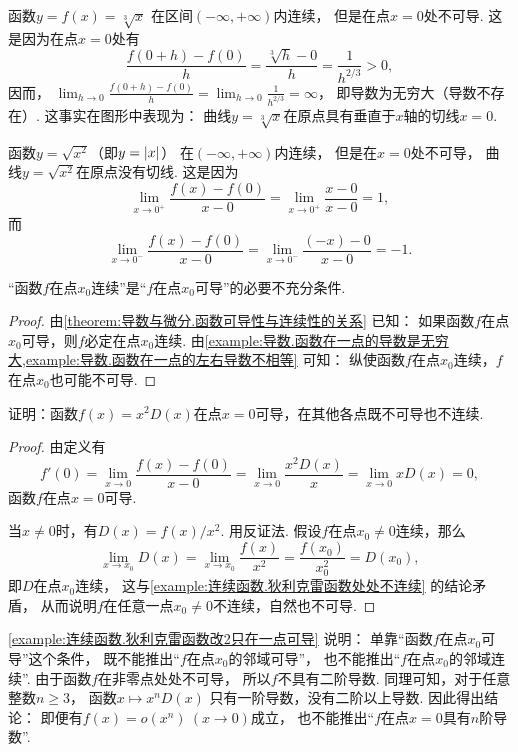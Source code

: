 \begin{example}\label{example:导数.函数在一点的导数是无穷大}
函数\(y=f(x)=\sqrt[3]x\)
在区间\((-\infty,+\infty)\)内连续，
但是在点\(x=0\)处不可导.
这是因为在点\(x=0\)处有\[
	\frac{f(0+h)-f(0)}{h}
	=\frac{\sqrt[3]{h}-0}{h}
	=\frac{1}{h^{2/3}}>0,
\]
因而，
\(\lim_{h\to0} \frac{f(0+h)-f(0)}{h}
=\lim_{h\to0} \frac{1}{h^{2/3}}
=\infty\)，
即导数为无穷大（导数不存在）.
这事实在图形中表现为：
曲线\(y=\sqrt[3]x\)在原点具有垂直于\(x\)轴的切线\(x=0\).
\end{example}

\begin{example}\label{example:导数.函数在一点的左右导数不相等}
函数\(y=\sqrt{x^2}\)（即\(y=\abs{x}\)）
在\((-\infty,+\infty)\)内连续，
但是在\(x=0\)处不可导，
曲线\(y=\sqrt{x^2}\)在原点没有切线.
这是因为\[
	\lim_{x\to0^+} \frac{f(x)-f(0)}{x-0}
	= \lim_{x\to0^+} \frac{x-0}{x-0}
	= 1,
\]
而\[
	\lim_{x\to0^-} \frac{f(x)-f(0)}{x-0}
	= \lim_{x\to0^-} \frac{(-x)-0}{x-0}
	= -1.
\]
\end{example}

\begin{theorem}
“函数\(f\)在点\(x_0\)连续”是“\(f\)在点\(x_0\)可导”的必要不充分条件.
\begin{proof}
由\cref{theorem:导数与微分.函数可导性与连续性的关系} 已知：
如果函数\(f\)在点\(x_0\)可导，则\(f\)必定在点\(x_0\)连续.
由\cref{example:导数.函数在一点的导数是无穷大,example:导数.函数在一点的左右导数不相等} 可知：
纵使函数\(f\)在点\(x_0\)连续，\(f\)在点\(x_0\)也可能不可导.
\end{proof}
\end{theorem}

\begin{example}\label{example:连续函数.狄利克雷函数改2只在一点可导}
证明：函数\(f(x) = x^2 D(x)\)在点\(x=0\)可导，在其他各点既不可导也不连续.
\begin{proof}
由定义有\[
	f'(0) = \lim_{x\to0} \frac{f(x) - f(0)}{x - 0}
	= \lim_{x\to0} \frac{x^2 D(x)}{x}
	= \lim_{x\to0} x D(x)
	= 0,%
\]
函数\(f\)在点\(x=0\)可导.

当\(x\neq0\)时，有\(D(x) = f(x) / x^2\).
用反证法.
假设\(f\)在点\(x_0\neq0\)连续，那么\[
	\lim_{x \to x_0} D(x)
	= \lim_{x \to x_0} \frac{f(x)}{x^2}
	= \frac{f(x_0)}{x_0^2}
	= D(x_0),
\]
即\(D\)在点\(x_0\)连续，
这与\cref{example:连续函数.狄利克雷函数处处不连续} 的结论矛盾，
从而说明\(f\)在任意一点\(x_0\neq0\)不连续，自然也不可导.
\end{proof}
\end{example}
\begin{remark}
\cref{example:连续函数.狄利克雷函数改2只在一点可导} 说明：
单靠“函数\(f\)在点\(x_0\)可导”这个条件，
既不能推出“\(f\)在点\(x_0\)的邻域可导”，
也不能推出“\(f\)在点\(x_0\)的邻域连续”.
由于函数\(f\)在非零点处处不可导，
所以\(f\)不具有二阶导数.
同理可知，对于任意整数\(n\geq3\)，
函数\(x \mapsto x^n D(x)\)
只有一阶导数，没有二阶以上导数.
因此得出结论：
即便有\(f(x) = o(x^n)\ (x\to0)\)成立，
也不能推出“\(f\)在点\(x=0\)具有\(n\)阶导数”.
\end{remark}

